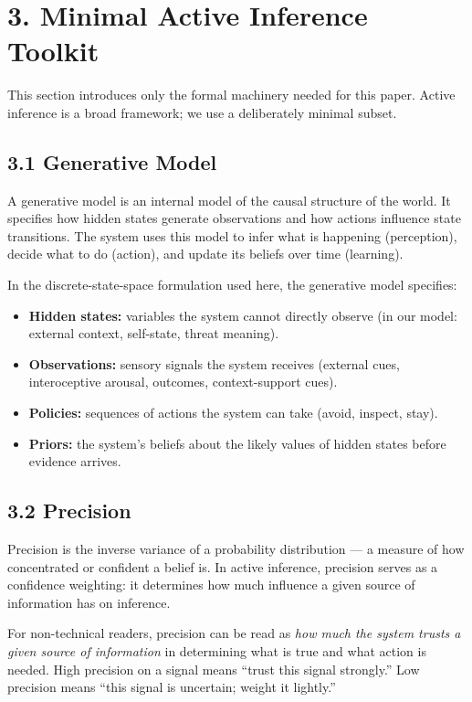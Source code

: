\documentclass[11pt]{article}
\providecommand{\tightlist}{%
  \setlength{\itemsep}{0pt}\setlength{\parskip}{0pt}}
\begin{document}
\section{3. Minimal Active Inference
Toolkit}\label{minimal-active-inference-toolkit}

This section introduces only the formal machinery needed for this paper.
Active inference is a broad framework; we use a deliberately minimal
subset.

\subsection{3.1 Generative Model}\label{generative-model}

A generative model is an internal model of the causal structure of the
world. It specifies how hidden states generate observations and how
actions influence state transitions. The system uses this model to infer
what is happening (perception), decide what to do (action), and update
its beliefs over time (learning).

In the discrete-state-space formulation used here, the generative model
specifies:

\begin{itemize}
\tightlist
\item
  \textbf{Hidden states:} variables the system cannot directly observe
  (in our model: external context, self-state, threat meaning).
\item
  \textbf{Observations:} sensory signals the system receives (external
  cues, interoceptive arousal, outcomes, context-support cues).
\item
  \textbf{Policies:} sequences of actions the system can take (avoid,
  inspect, stay).
\item
  \textbf{Priors:} the system's beliefs about the likely values of
  hidden states before evidence arrives.
\end{itemize}

\subsection{3.2 Precision}\label{precision}

Precision is the inverse variance of a probability distribution --- a
measure of how concentrated or confident a belief is. In active
inference, precision serves as a confidence weighting: it determines how
much influence a given source of information has on inference.

For non-technical readers, precision can be read as \emph{how much the
system trusts a given source of information} in determining what is true
and what action is needed. High precision on a signal means ``trust this
signal strongly.'' Low precision means ``this signal is uncertain;
weight it lightly.''
\end{document}
